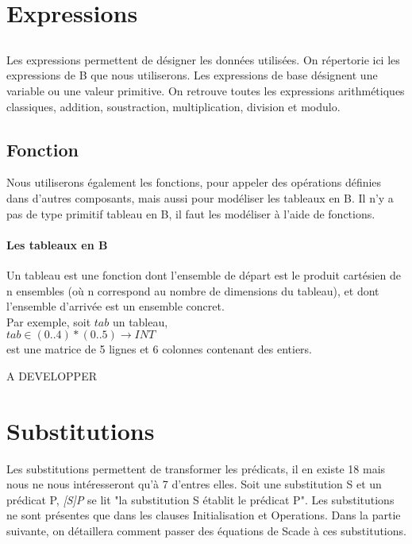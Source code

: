 
\section{Expressions}

\subsection{}
Les expressions permettent de désigner les données utilisées. On
répertorie ici les expressions de B que nous utiliserons. Les
expressions de base désignent une variable ou une valeur primitive.
On retrouve toutes les expressions arithmétiques classiques, addition,
soustraction, multiplication, division et modulo.

\subsection{Fonction}

Nous utiliserons également les fonctions, pour appeler des opérations
définies dans d'autres composants, mais aussi pour modéliser les
tableaux en B. Il n'y a pas de type primitif tableau en B, il faut les
modéliser à l'aide de fonctions.

\paragraph{Les tableaux en B}
Un tableau est une fonction dont l'ensemble de départ est le produit
cartésien de n ensembles (où n correspond au nombre de dimensions du
tableau), et dont l'ensemble d'arrivée est un ensemble concret.\\
Par exemple, soit $tab$ un tableau, \\
$tab \in (0..4)*(0..5) \rightarrow INT$ \\
est une matrice de 5 lignes et 6 colonnes contenant des entiers.

A DEVELOPPER 




\section{Substitutions}
Les substitutions permettent de transformer les prédicats, il en existe 18 mais
nous ne nous intéresseront qu'à 7 d'entres elles. Soit une substitution S et un
prédicat P, \emph{[S]P} se lit "la substitution S établit le prédicat P".
Les substitutions ne sont présentes que dans les clauses Initialisation et
Operations. Dans la partie suivante, on détaillera comment passer des équations
de Scade à ces substitutions.

